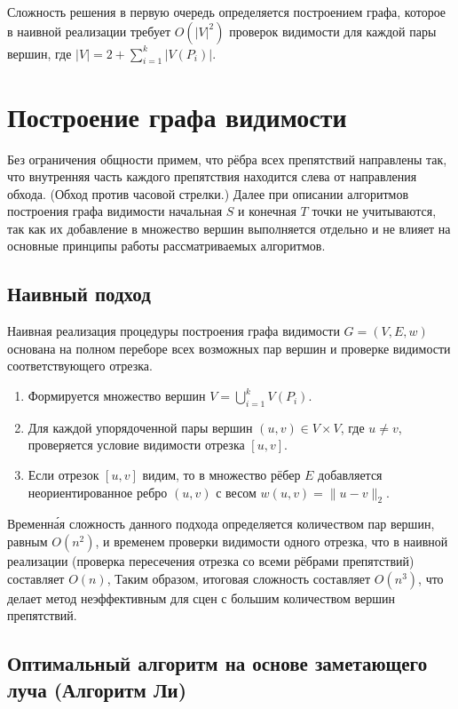 \documentclass{article}
\theoremstyle{definition}
\begin{document}
Сложность решения в первую очередь определяется построением графа, которое в наивной реализации требует $O(|V|^2)$ проверок видимости
для каждой пары вершин, где $|V| = 2 + \sum_{i=1}^k |V(P_i)|$. 

\section{Построение графа видимости}
\label{sec:construction}
Без ограничения общности примем, что рёбра всех препятствий направлены так, что внутренняя часть каждого препятствия находится слева от направления обхода. (Обход против часовой стрелки.)
Далее при описании алгоритмов построения графа видимости начальная $S$ и конечная $T$ точки не учитываются, так как их добавление в множество вершин выполняется отдельно и не влияет на
основные принципы работы рассматриваемых алгоритмов.

\subsection{Наивный подход}

Наивная реализация процедуры построения графа видимости $G=(V,E,w)$ основана на полном переборе всех возможных пар вершин
и проверке видимости соответствующего отрезка.

\begin{enumerate}[label=\textbf{Шаг \arabic*.}]
    \item Формируется множество вершин $V = \bigcup_{i=1}^k V(P_i)$.
    \item Для каждой упорядоченной пары вершин $(u, v) \in V \times V$, где $u \neq v$, проверяется условие видимости отрезка $[u, v]$.
    \item Если отрезок $[u, v]$ видим, то в множество рёбер $E$ добавляется неориентированное ребро $(u, v)$ с весом $w(u,v) = \|u - v\|_2$.
\end{enumerate}

Временн\'{а}я сложность данного подхода определяется количеством пар вершин, равным $O(n^2)$,
и временем проверки видимости одного отрезка, что в наивной реализации (проверка пересечения
отрезка со всеми рёбрами препятствий) составляет $O(n)$,
Таким образом, итоговая сложность составляет $O(n^3)$, 
что делает метод неэффективным для сцен с большим количеством вершин препятствий.

\subsection{Оптимальный алгоритм на основе заметающего луча (Алгоритм Ли)}
\end{document}
